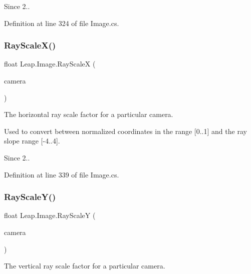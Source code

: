 \begin{DoxySince}{Since}
2.. 
\end{DoxySince}


Definition at line 324 of file Image.\+cs.

\mbox{\label{class_leap_1_1_image_a30e614bb33154b1f3e7536a502811278}} 
\subsubsection{\texorpdfstring{RayScaleX()}{RayScaleX()}}
{\footnotesize\ttfamily float Leap.\+Image.\+Ray\+ScaleX (\begin{DoxyParamCaption}\item[{\mbox{\hyperlink{class_leap_1_1_image_a28310e43e0f2d7f7117e1b45330bdc38}{Camera\+Type}}}]{camera }\end{DoxyParamCaption})}



The horizontal ray scale factor for a particular camera. 

Used to convert between normalized coordinates in the range \mbox{[}0..1\mbox{]} and the ray slope range \mbox{[}-\/4..4\mbox{]}.

\begin{DoxySince}{Since}
2.. 
\end{DoxySince}


Definition at line 339 of file Image.\+cs.

\mbox{\label{class_leap_1_1_image_a9d5749a8512e3c14d48cf54d6e00140a}} 
\subsubsection{\texorpdfstring{RayScaleY()}{RayScaleY()}}
{\footnotesize\ttfamily float Leap.\+Image.\+Ray\+ScaleY (\begin{DoxyParamCaption}\item[{\mbox{\hyperlink{class_leap_1_1_image_a28310e43e0f2d7f7117e1b45330bdc38}{Camera\+Type}}}]{camera }\end{DoxyParamCaption})}



The vertical ray scale factor for a particular camera. 

